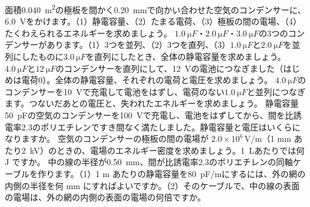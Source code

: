 \bkendproblems
{}
\bkproblem 面積\qty{0.040}{m^2}の極板を間かく\qty{0.20}{mm}で向かい合わせた空気のコンデンサーに、\qty{6.0}{V}をかけます。（1）静電容量、（2）たまる電荷、（3）極板の間の電場、（4）たくわえられるエネルギーを求めましょう。
\bkproblem $\qty{1.0}{\micro F}$・$\qty{2.0}{\micro F}$・$\qty{3.0}{\micro F}$の3つのコンデンサーがあります。（1）3つを並列、（2）3つを直列、（3）$\qty{1.0}{\micro F}$と$\qty{2.0}{\micro F}$を並列にしたものに$\qty{3.0}{\micro F}$を直列にしたとき、全体の静電容量を求めましょう。
\bkproblem $\qty{4.0}{\micro F}$と$\qty{12}{\micro F}$のコンデンサーを直列にして、\qty{12}{V}の電池につなぎました（はじめは電荷0）。全体の静電容量、それぞれの電荷と電圧を求めましょう。
\bkproblem $\qty{4.0}{\micro F}$のコンデンサーを\qty{10}{V}で充電して電池をはずし、電荷のない$\qty{1.0}{\micro F}$と並列につなぎます。つないだあとの電圧と、失われたエネルギーを求めましょう。
\bkproblem 静電容量\qty{50}{pF}の空気のコンデンサーを\qty{100}{V}で充電し、電池をはずしてから、間を比誘電率2.3のポリエチレンですき間なく満たしました。静電容量と電圧はいくらになりますか。
\bkproblem 空気のコンデンサーの極板の間の電場が $2.0\times10^6$\,V/m（1 mm あたり\qty{2}{kV}）のときの、電場のエネルギー密度を求めましょう。\qty{1}{L}あたりでは何 J ですか。
\bkproblem 中の線の半径が\qty{0.50}{mm}、間が比誘電率2.3のポリエチレンの同軸ケーブルを作ります。（1）1 m あたりの静電容量を\qty{80}{pF/m}にするには、外の網の内側の半径を何 mm にすればよいですか。（2）そのケーブルで、中の線の表面の電場は、外の網の内側の表面の電場の何倍ですか。

